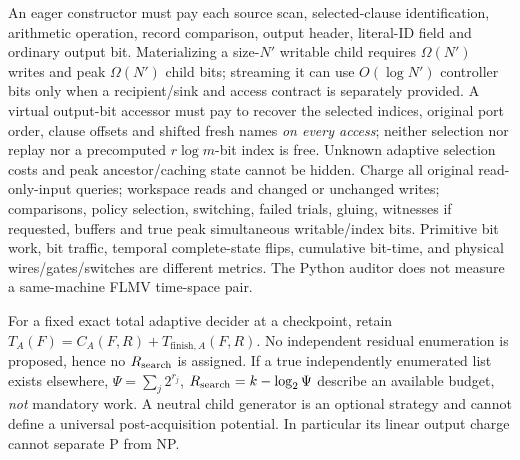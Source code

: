 \documentclass[11pt]{article}
\begin{document}
An eager constructor must pay each source scan, selected-clause identification, arithmetic operation, record comparison, output header, literal-ID field and ordinary output bit. Materializing a size-\(N'\) writable child requires \(\Omega(N')\) writes and peak \(\Omega(N')\) child bits; streaming it can use \(O(\log N')\) controller bits only when a recipient/sink and access contract is separately provided. A virtual output-bit accessor must pay to recover the selected indices, original port order, clause offsets and shifted fresh names \emph{on every access}; neither selection nor replay nor a precomputed \(r\log m\)-bit index is free. Unknown adaptive selection costs and peak ancestor/caching state cannot be hidden. Charge all original read-only-input queries; workspace reads and changed or unchanged writes; comparisons, policy selection, switching, failed trials, gluing, witnesses if requested, buffers and true peak simultaneous writable/index bits. Primitive bit work, bit traffic, temporal complete-state flips, cumulative bit-time, and physical wires/gates/switches are different metrics. The Python auditor does not measure a same-machine FLMV time-space pair.

For a fixed exact total adaptive decider at a checkpoint, retain
\(T_A(F)=C_A(F,R)+T_{\mathrm{finish},A}(F,R)\).
No independent residual enumeration is proposed, hence no \(R_{\rm search}\) is assigned. If a true independently enumerated list exists elsewhere, \(\Psi=\sum_j2^{r_j}\), \(R_{\rm search}=k-\log_2\Psi\) describe an available budget, \emph{not} mandatory work. A neutral child generator is an optional strategy and cannot define a universal post-acquisition potential. In particular its linear output charge cannot separate P from NP.
\end{document}
